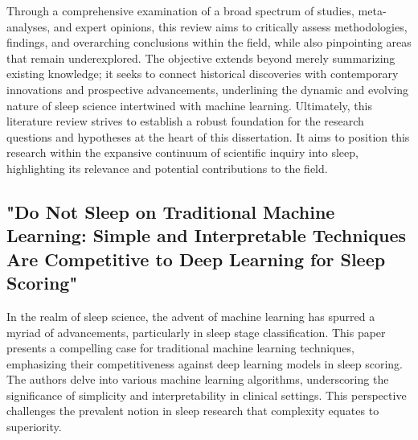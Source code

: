 \documentclass[12pt, a4paper,oneside]{book}
\numberwithin{equation}{section}
\begin{document}
Through a comprehensive examination of a broad spectrum of studies, meta-analyses, and expert opinions, this review aims to critically assess methodologies, findings, and overarching conclusions within the field, while also pinpointing areas that remain underexplored. The objective extends beyond merely summarizing existing knowledge; it seeks to connect historical discoveries with contemporary innovations and prospective advancements, underlining the dynamic and evolving nature of sleep science intertwined with machine learning.
Ultimately, this literature review strives to establish a robust foundation for the research questions and hypotheses at the heart of this dissertation. It aims to position this research within the expansive continuum of scientific inquiry into sleep, highlighting its relevance and potential contributions to the field.
\subsection{"Do Not Sleep on Traditional Machine Learning: Simple and Interpretable Techniques Are Competitive to Deep Learning for Sleep Scoring"}

In the realm of sleep science, the advent of machine learning has spurred a myriad of advancements, particularly in sleep stage classification. This paper presents a compelling case for traditional machine learning techniques, emphasizing their competitiveness against deep learning models in sleep scoring. The authors delve into various machine learning algorithms, underscoring the significance of simplicity and interpretability in clinical settings. This perspective challenges the prevalent notion in sleep research that complexity equates to superiority.\cite{VanDerDonckt2021}
\end{document}
